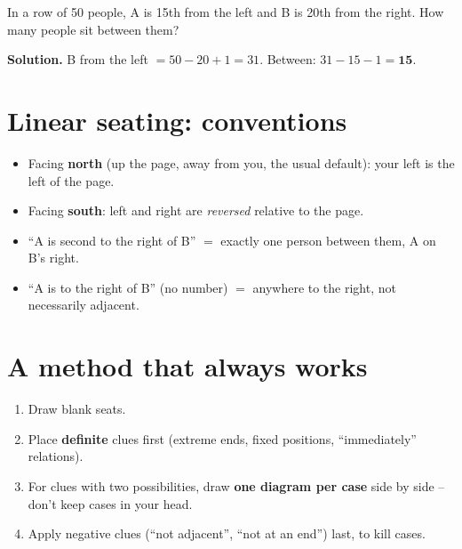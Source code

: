 \documentclass[11pt,a4paper,openany]{report}
\begin{document}
\begin{example}
In a row of 50 people, A is 15th from the left and B is 20th from the right. How many people sit between them?

\textbf{Solution.} B from the left $=50-20+1=31$. Between: $31-15-1=\mathbf{15}$.
\end{example}

\section{Linear seating: conventions}
\begin{idea}
\begin{itemize}[nosep]
\item Facing \textbf{north} (up the page, away from you, the usual default): your left is the left of the page.
\item Facing \textbf{south}: left and right are \emph{reversed} relative to the page.
\item ``A is second to the right of B'' $=$ exactly one person between them, A on B's right.
\item ``A is to the right of B'' (no number) $=$ anywhere to the right, not necessarily adjacent.
\end{itemize}
\end{idea}

\section{A method that always works}
\begin{enumerate}[nosep]
\item Draw blank seats.
\item Place \textbf{definite} clues first (extreme ends, fixed positions, ``immediately'' relations).
\item For clues with two possibilities, draw \textbf{one diagram per case} side by side -- don't keep cases in your head.
\item Apply negative clues (``not adjacent'', ``not at an end'') last, to kill cases.
\end{enumerate}
\end{document}

